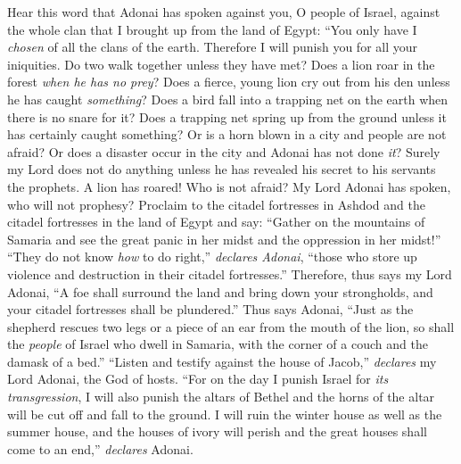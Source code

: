 \begin{biblechapter} %
 Hear this word that Adonai has spoken against you, O people of Israel, against the whole clan that I brought up from the land of Egypt:
\verse “You only have I \textit{chosen} of all the clans of the earth. Therefore I will punish you for all your iniquities.
\verse Do two walk together unless they have met?
\verse Does a lion roar in the forest \textit{when he has no prey}? Does a fierce, young lion cry out from his den unless he has caught \textit{something}?
\verse Does a bird fall into a trapping net on the earth when there is no snare for it? Does a trapping net spring up from the ground unless it has certainly caught something?
\verse Or is a horn blown in a city and people are not afraid? Or does a disaster occur in the city and Adonai has not done \textit{it}?
\verse Surely my Lord does not do anything unless he has revealed his secret to his servants the prophets.
\verse A lion has roared! Who is not afraid? My Lord Adonai has spoken, who will not prophesy?
\verse Proclaim to the citadel fortresses in Ashdod and the citadel fortresses in the land of Egypt and say: “Gather on the mountains of Samaria and see the great panic in her midst and the oppression in her midst!”
\verse “They do not know \textit{how} to do right,” \textit{declares Adonai}, “those who store up violence and destruction in their citadel fortresses.”
\verse Therefore, thus says my Lord Adonai, “A foe shall surround the land and bring down your strongholds, and your citadel fortresses shall be plundered.”
\verse Thus says Adonai, “Just as the shepherd rescues two legs or a piece of an ear from the mouth of the lion, so shall the \textit{people} of Israel who dwell in Samaria, with the corner of a couch and the damask of a bed.”
\verse “Listen and testify against the house of Jacob,” \textit{declares} my Lord Adonai, the God of hosts.
\verse “For on the day I punish Israel for \textit{its transgression}, I will also punish the altars of Bethel and the horns of the altar will be cut off and fall to the ground.
\verse I will ruin the winter house as well as the summer house, and the houses of ivory will perish and the great houses shall come to an end,” \textit{declares} Adonai.
\end{biblechapter}

